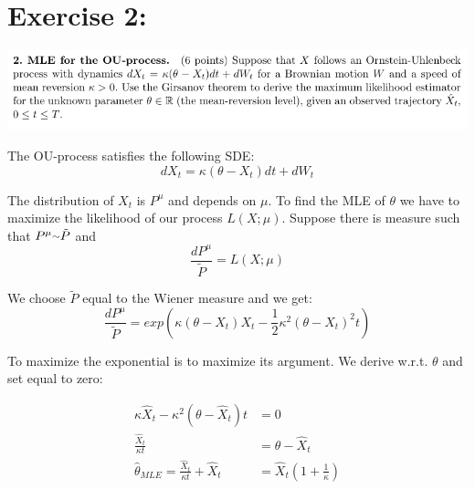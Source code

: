 \documentclass[document.tex]{subfiles}
\begin{document}
\section*{Exercise 2:}


\includegraphics[width=\textwidth]{ex2.png}

The OU-process satisfies the following SDE:
\begin{equation}
dX_t = \kappa(\theta - X_t)dt + dW_t
\end{equation}

The distribution of $X_t$ is $P^{\mu}$ and depends on $\mu$. To find the MLE of $\theta$ we have to maximize the likelihood of our process $L(X;\mu)$. Suppose there is measure such that $P^{\mu} {\raise.17ex\hbox{$\scriptstyle\sim$}} \tilde{P}$ and
\begin{equation}
\frac{dP^{\mu}}{\tilde{P}} = L(X;\mu)
\end{equation}

We choose $\tilde{P}$ equal to the Wiener measure and we get:
\begin{equation}
\frac{dP^{\mu}}{\tilde{P}} = exp(\kappa (\theta - X_t)X_t - \frac{1}{2} \kappa^2(\theta - X_t)^2 t)
\end{equation}

To maximize the exponential is to maximize its argument. We derive w.r.t. $\theta$ and set equal to zero:

\begin{align*}
\kappa \hat{X}_t - \kappa^2(\theta - \hat{X}_t) t &= 0 \\
\frac{ \hat{X}_t }{ \kappa t } &= \theta - \hat{X}_t \\
\hat{\theta}_{MLE} = \frac{ \hat{X}_t }{ \kappa t } + \hat{X}_t &= \hat{X}_t (1 + \frac{ 1 }{ \kappa })
\end{align*}
\end{document}
